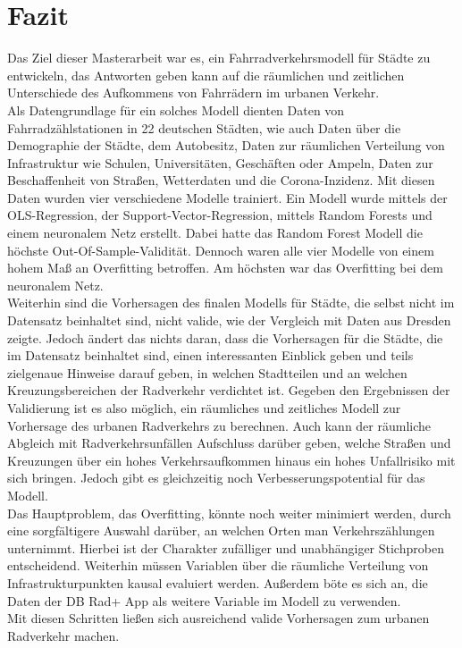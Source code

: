 \documentclass[a4paper,12pt]{thesis}
\begin{document}
\section{Fazit}

Das Ziel dieser Masterarbeit war es, ein Fahrradverkehrsmodell für Städte zu entwickeln, das Antworten geben kann auf die räumlichen und zeitlichen Unterschiede des Aufkommens von Fahrrädern im urbanen Verkehr.\\
Als Datengrundlage für ein solches Modell dienten Daten von Fahrradzählstationen in 22 deutschen Städten, wie auch Daten über die Demographie der Städte, dem Autobesitz, Daten zur räumlichen Verteilung von Infrastruktur wie Schulen, Universitäten, Geschäften oder Ampeln, Daten zur Beschaffenheit von Straßen, Wetterdaten und die Corona-Inzidenz. Mit diesen Daten wurden vier verschiedene Modelle trainiert. Ein Modell wurde mittels der OLS-Regression, der Support-Vector-Regression, mittels Random Forests und einem neuronalem Netz erstellt. Dabei hatte das Random Forest Modell die höchste Out-Of-Sample-Validität. Dennoch waren alle vier Modelle von einem hohem Maß an Overfitting betroffen. Am höchsten war das Overfitting bei dem neuronalem Netz.\\
Weiterhin sind die Vorhersagen des finalen Modells für Städte, die selbst nicht im Datensatz beinhaltet sind, nicht valide, wie der Vergleich mit Daten aus Dresden zeigte. Jedoch ändert das nichts daran, dass die Vorhersagen für die Städte, die im Datensatz beinhaltet sind, einen interessanten Einblick geben und teils zielgenaue Hinweise darauf geben, in welchen Stadtteilen und an welchen Kreuzungsbereichen der Radverkehr verdichtet ist. Gegeben den Ergebnissen der Validierung ist es also möglich, ein räumliches und zeitliches Modell zur Vorhersage des urbanen Radverkehrs zu berechnen. Auch kann der räumliche Abgleich mit Radverkehrsunfällen Aufschluss darüber geben, welche Straßen und Kreuzungen über ein hohes Verkehrsaufkommen hinaus ein hohes Unfallrisiko mit sich bringen. Jedoch gibt es gleichzeitig noch Verbesserungspotential für das Modell.\\
Das Hauptproblem, das Overfitting, könnte noch weiter minimiert werden, durch eine sorgfältigere Auswahl darüber, an welchen Orten man Verkehrszählungen unternimmt. Hierbei ist der Charakter zufälliger und unabhängiger Stichproben entscheidend. Weiterhin müssen Variablen über die räumliche Verteilung von Infrastrukturpunkten kausal evaluiert werden. Außerdem böte es sich an, die Daten der DB Rad+ App als weitere Variable im Modell zu verwenden.\\
Mit diesen Schritten ließen sich ausreichend valide Vorhersagen zum urbanen Radverkehr machen.
\end{document}
